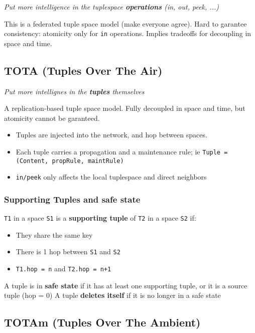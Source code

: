 \documentclass[a4paper]{report}
\begin{document}
\emph{Put more intelligence in the tuplespace \textbf{operations} (in, out, peek, ...)}

This is a federated tuple space model (make everyone agree). Hard to garantee consistency: atomicity only for \texttt{in} operations. Implies tradeoffs for decoupling in space and time.

\subsection{TOTA (Tuples Over The Air)}

\emph{Put more intellignes in the \textbf{tuples} themselves}

A replication-based tuple space model. Fully decoupled in space and time, but atomicity cannot be garanteed.

\begin{itemize}
\item Tuples are injected into the network, and hop between spaces.
\item Each tuple carries a propagation and a maintenance rule; ie \texttt{Tuple = (Content, propRule, maintRule)}
\item \texttt{in/peek} only affects the local tuplespace and direct neighbors
\end{itemize}

\subsubsection{Supporting Tuples and safe state}

\texttt{T1} in a space \texttt{S1} is a \textbf{supporting tuple} of \texttt{T2} in a space \texttt{S2} if:

\begin{itemize}
\item They share the same key
\item There is 1 hop between \texttt{S1} and \texttt{S2}
\item \texttt{T1.hop = n} and \texttt{T2.hop = n+1}
\end{itemize}

A tuple is in \textbf{safe state} if it has at least one supporting tuple, or it is a source tuple (hop = 0) A tuple \textbf{deletes itself} if it is no longer in a safe state

\subsection{TOTAm (Tuples Over The Ambient)}
\end{document}
